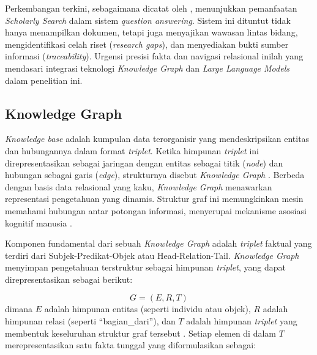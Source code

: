 Perkembangan terkini, sebagaimana dicatat oleh \citet{gupta2024comprehensivesurveyretrievalaugmentedgeneration}, menunjukkan pemanfaatan \textit{Scholarly Search} dalam sistem \textit{question answering}. Sistem ini dituntut tidak hanya menampilkan dokumen, tetapi juga menyajikan wawasan lintas bidang, mengidentifikasi celah riset (\textit{research gaps}), dan menyediakan bukti sumber informasi (\textit{traceability}). Urgensi presisi fakta dan navigasi relasional inilah yang mendasari integrasi teknologi \textit{Knowledge Graph} dan \textit{Large Language Models} dalam penelitian ini.

\subsection{Knowledge Graph}

\textit{Knowledge base} adalah kumpulan data terorganisir yang mendeskripsikan entitas dan hubungannya dalam format \textit{triplet}. Ketika himpunan \textit{triplet} ini direpresentasikan sebagai jaringan dengan entitas sebagai titik (\textit{node}) dan hubungan sebagai garis (\textit{edge}), strukturnya disebut \textit{Knowledge Graph} \citep{mondal2021end}. Berbeda dengan basis data relasional yang kaku, \textit{Knowledge Graph} menawarkan representasi pengetahuan yang dinamis. Struktur graf ini memungkinkan mesin memahami hubungan antar potongan informasi, menyerupai mekanisme asosiasi kognitif manusia \citep{cheng2025humancognitioninspiredrag}.

Komponen fundamental dari sebuah \textit{Knowledge Graph} adalah \textit{triplet} faktual yang terdiri dari Subjek-Predikat-Objek atau Head-Relation-Tail. \textit{Knowledge Graph} menyimpan pengetahuan terstruktur sebagai himpunan \textit{triplet}, yang dapat direpresentasikan sebagai berikut:

\begin{equation}
    G = (E, R, T)
    \label{eq:kg-definition}
\end{equation}
dimana $E$ adalah himpunan entitas (seperti individu atau objek), $R$ adalah himpunan relasi (seperti ``bagian\_dari''), dan $T$ adalah himpunan \textit{triplet} yang membentuk keseluruhan struktur graf tersebut \citep{Hogan_2021}. Setiap elemen di dalam $T$ merepresentasikan satu fakta tunggal yang diformulasikan sebagai:

